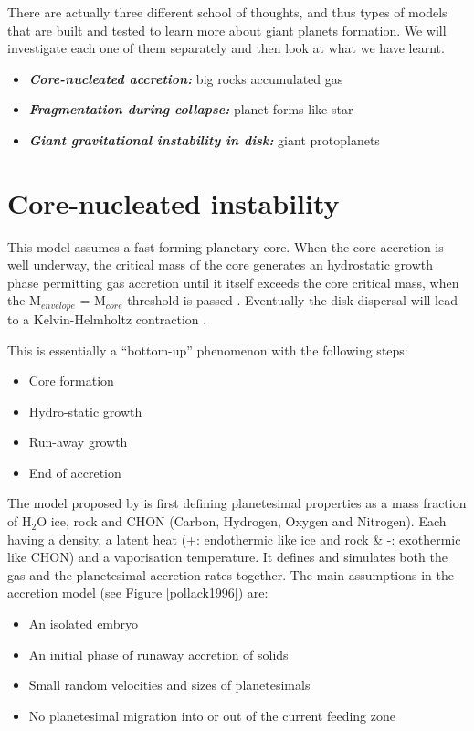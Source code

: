 \documentclass[12pt]{article} %
\begin{document}
There are actually three different school of thoughts, and thus types of models that are built and tested to learn more about giant planets formation. We will investigate each one of them separately and then look at what we have learnt.

\begin{itemize}
\setlength\itemsep{0em}  
\item \textit{\textbf{Core-nucleated accretion:}} big rocks accumulated gas 
\item \textit{\textbf{Fragmentation during collapse:}} planet forms like star
\item \textit{\textbf{Giant gravitational instability in disk:}} giant protoplanets 
\end{itemize}



\section{Core-nucleated instability}\vspace{-2ex}\titlerule[1pt]\bigskip

This model assumes a fast forming planetary core. When the core accretion is well underway, the critical mass of the core generates an hydrostatic growth phase permitting gas accretion until it itself exceeds the core critical mass, when the M$_{envelope}$ = M$_{core}$ threshold is passed \cite{miguel2008core}. Eventually the disk dispersal will lead to a Kelvin-Helmholtz contraction \cite{armitage2010astrophysics}. \newline\linebreak
\clearpage

\noindent This is essentially a ``bottom-up'' phenomenon with the following steps:
\begin{itemize}
\setlength\itemsep{0em}
\item Core formation
\item Hydro-static growth
\item Run-away growth
\item End of accretion
\end{itemize}

\noindent The model proposed by \cite{pollack1996formation} is first defining planetesimal properties as a mass fraction of H$_2$O ice, rock and CHON (Carbon, Hydrogen, Oxygen and Nitrogen). Each having a density, a latent heat (+: endothermic like ice and rock \& -: exothermic like CHON) and a vaporisation temperature. It defines and simulates both the gas and the planetesimal accretion rates together. \newline\linebreak
The main assumptions in the accretion model (see Figure \ref{pollack1996}) are: 
\begin{itemize}
\setlength\itemsep{0em}
\item An isolated embryo
\item An initial phase of runaway accretion of solids
\item Small random velocities and sizes of planetesimals
\item No planetesimal migration into or out of the current feeding zone
\end{itemize}
\end{document}
